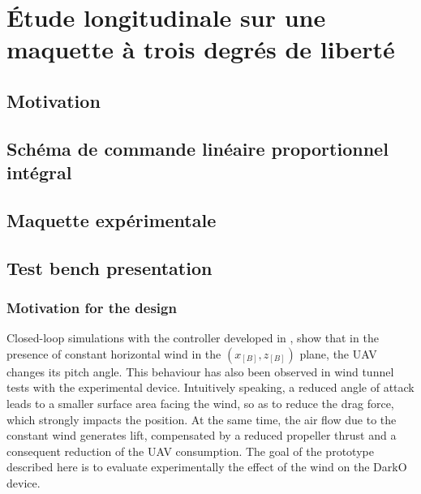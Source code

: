 \chapter{Étude longitudinale sur une maquette à trois degrés de liberté}
\minitoc

\section{Motivation}

\section{Schéma de commande linéaire proportionnel intégral}

\section{Maquette expérimentale}

\section{Test bench presentation}\label{sec:test_bench}
\subsection{Motivation for the design}\label{subsec:motivation}
Closed-loop simulations with the controller developed in \cite[]{sansou22}, show that in the presence of constant horizontal wind in the $(x_{[B]},z_{[B]})$ plane, the UAV changes its pitch angle. This behaviour has also been observed in wind tunnel tests with the experimental device. Intuitively speaking, a reduced angle of attack leads to a smaller surface area facing the wind, so as to reduce the drag force, which strongly impacts the position. At the same time, the air flow due to the constant wind generates lift, compensated by a reduced propeller thrust and a consequent reduction of the UAV consumption. The goal of the prototype described here is to evaluate experimentally the effect of the wind on the DarkO device.


